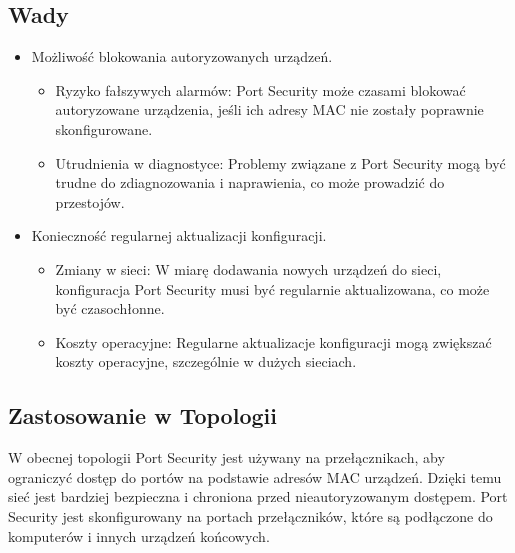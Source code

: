 \subsection{Wady}
\begin{itemize}
    \item Możliwość blokowania autoryzowanych urządzeń.
    \begin{itemize}
        \item Ryzyko fałszywych alarmów: Port Security może czasami blokować autoryzowane urządzenia, jeśli ich adresy MAC nie zostały poprawnie skonfigurowane.
        \item Utrudnienia w diagnostyce: Problemy związane z Port Security mogą być trudne do zdiagnozowania i naprawienia, co może prowadzić do przestojów.
    \end{itemize}
    \item Konieczność regularnej aktualizacji konfiguracji.
    \begin{itemize}
        \item Zmiany w sieci: W miarę dodawania nowych urządzeń do sieci, konfiguracja Port Security musi być regularnie aktualizowana, co może być czasochłonne.
        \item Koszty operacyjne: Regularne aktualizacje konfiguracji mogą zwiększać koszty operacyjne, szczególnie w dużych sieciach.
    \end{itemize}
\end{itemize}

\subsection{Zastosowanie w Topologii}
W obecnej topologii Port Security jest używany na przełącznikach, aby ograniczyć dostęp do portów na podstawie adresów MAC urządzeń. Dzięki temu sieć jest bardziej bezpieczna i chroniona przed nieautoryzowanym dostępem. Port Security jest skonfigurowany na portach przełączników, które są podłączone do komputerów i innych urządzeń końcowych.

